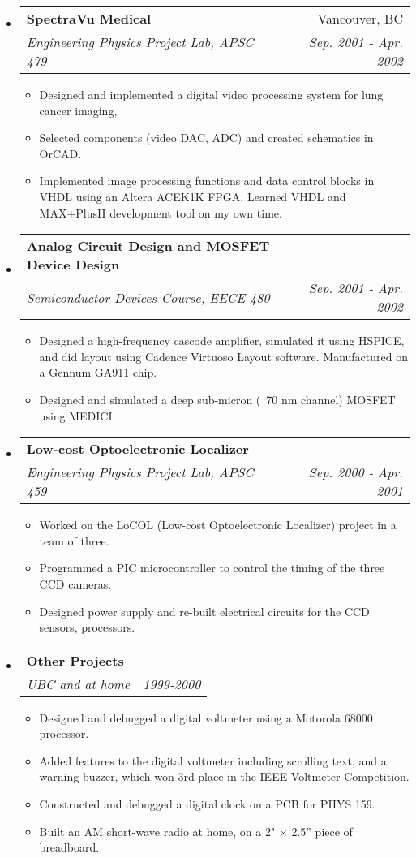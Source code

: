 \documentclass[letterpaper,11pt]{article}
\makeatletter
\newcommand{\resitem}[1]{\item #1 \vspace{-2pt}}
\newcommand{\resheading}[1]{{\large \parashade[.9]{sharpcorners}{\textbf{#1 \vphantom{p\^{E}}}}}}
\newcommand{\ressubheading}[4]{
\begin{tabular*}{6.5in}{l@{\extracolsep{\fill}}r}
		\textbf{#1} & #2 \\
		\textit{#3} & \textit{#4} \\
\end{tabular*}\vspace{-6pt}}
\makeatother
\begin{document}
\resheading{School Projects}
\begin{itemize}
\item
	\ressubheading{SpectraVu Medical}{Vancouver, BC}{Engineering Physics Project Lab, APSC 479}{Sep. 2001 - Apr. 2002}
	\begin{itemize}
		\resitem{	Designed and implemented a digital video processing system for lung cancer imaging,}
		\resitem{Selected components (video DAC, ADC) and created schematics in OrCAD.}
		\resitem{Implemented image processing functions and data control blocks in VHDL using an Altera ACEK1K FPGA.  Learned VHDL and MAX+PlusII development tool on my own time.}
	\end{itemize}

\item
	\ressubheading{Analog Circuit Design and MOSFET Device Design}{}{Semiconductor Devices Course, EECE 480}{Sep. 2001 - Apr. 2002}
	\begin{itemize}
		\resitem{Designed a high-frequency cascode amplifier, simulated it using HSPICE, and did layout using Cadence Virtuoso Layout software.  Manufactured on a Gennum GA911 chip.}
		\resitem{Designed and simulated a deep sub-micron (~70 nm channel) MOSFET using MEDICI.}
	\end{itemize}

\item
	\ressubheading{Low-cost Optoelectronic Localizer}{}{Engineering Physics Project Lab, APSC 459}{Sep. 2000 - Apr. 2001}
	\begin{itemize}
		\resitem{Worked on the LoCOL (Low-cost Optoelectronic Localizer) project in a team of three.}
		\resitem{Programmed a PIC microcontroller to control the timing of the three CCD cameras.}
		\resitem{Designed power supply and re-built electrical circuits for the CCD sensors, processors.}
	\end{itemize}

\item
	\ressubheading{Other Projects}{}{UBC and at home}{1999-2000}
	\begin{itemize}
		\resitem{Designed and debugged a digital voltmeter using a Motorola 68000 processor.}
		\resitem{Added features to the digital voltmeter including scrolling text, and a warning buzzer, which won 3rd place in the IEEE Voltmeter Competition.}
		\resitem{Constructed and debugged a digital clock on a PCB for PHYS 159.}
		\resitem{Built an AM short-wave radio at home, on a 2" $\times$ 2.5'' piece of breadboard.}
	\end{itemize}

\end{itemize}
\end{document}

